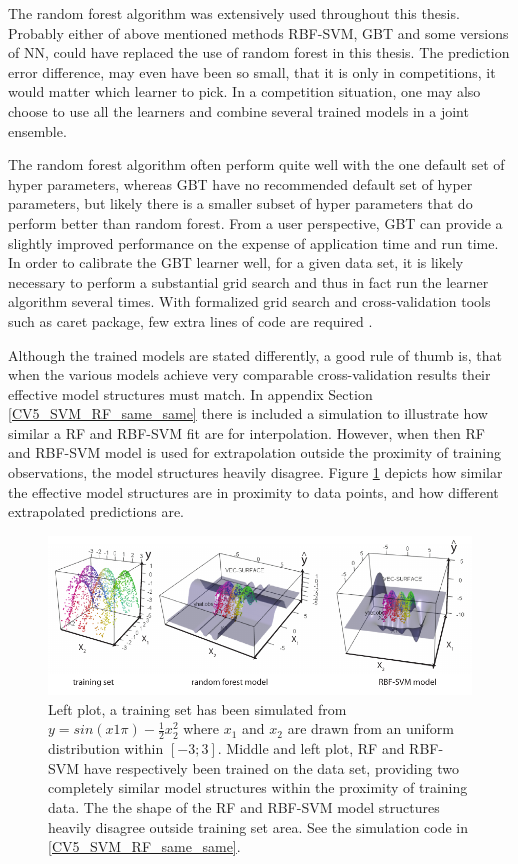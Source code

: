 The random forest algorithm was extensively used throughout this thesis. Probably either of above mentioned methods RBF-SVM, GBT and some versions of NN, could have replaced the use of random forest in this thesis. The prediction error difference, may even have been so small, that it is only in competitions, it would matter which learner to pick. In a competition situation, one may also choose to use all the learners and combine several trained models in a joint ensemble. 

The random forest algorithm often perform quite well with the one default set of hyper parameters, whereas GBT have no recommended default set of hyper parameters, but likely there is a smaller subset of hyper parameters that do perform better than random forest. From a user perspective, GBT can provide a slightly improved performance on the expense of application time and run time. In order to calibrate the GBT learner well, for a given data set, it is likely necessary to perform a substantial grid search and thus in fact run the learner algorithm several times. With formalized grid search and cross-validation tools such as caret package, few extra lines of code are required \cite{kuhn2015short}.

Although the trained models are stated differently, a good rule of thumb is, that when the various models achieve very comparable cross-validation results their effective model structures must match. In appendix Section \ref{CV5_SVM_RF_same_same} there is included a simulation to illustrate how similar a RF and RBF-SVM fit are for interpolation. However, when then RF and RBF-SVM model is used for extrapolation outside the proximity of training observations, the model structures heavily disagree. Figure \ref{svmVSrf} depicts how similar the effective model structures are in proximity to data points, and how different extrapolated predictions are.

\begin{figure}[!htbp]
\includegraphics[width=\textwidth,height=\textheight,keepaspectratio]{graphics/svmVSrf.pdf}
\caption{Left plot, a training set has been simulated from $y = sin(x1 \pi) − \frac 1 2 x_2^2$ where $x_1$ and $x_2$ are drawn from an uniform distribution within $[-3;3]$. Middle and left plot, RF and RBF-SVM have respectively been trained on the data set, providing two completely similar model structures within the proximity of training data. The the shape of the RF and RBF-SVM model structures heavily disagree outside training set area. See the simulation code in \ref{CV5_SVM_RF_same_same}.} 
\label{svmVSrf}
\end{figure}

